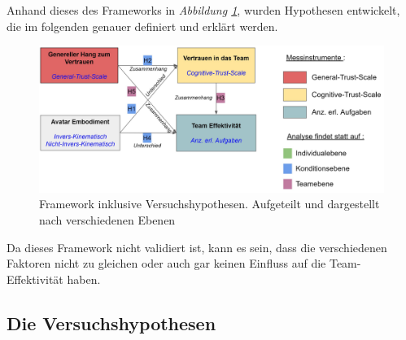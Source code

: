 \documentclass[a4paper,11pt]{article}%
\renewcommand{\\}{\vspace*{0.5\baselineskip} \newline}
\begin{document}
Anhand dieses des Frameworks in \textit{Abbildung \ref{Versuchshypothesen}}, wurden Hypothesen entwickelt, die im folgenden genauer definiert und erklärt werden.

\begin{figure}[H]
		\begin{footnotesize}
			\includegraphics[width=\textwidth]{Abbildungen/Versuchshypothesen_02.JPG}
			
			\caption{Framework inklusive Versuchshypothesen. Aufgeteilt und dargestellt nach verschiedenen Ebenen}
			\label{Versuchshypothesen}
		\end{footnotesize}
	\end{figure}	

\newpage

Da dieses Framework nicht validiert ist, kann es sein, dass die verschiedenen Faktoren nicht zu gleichen oder auch gar keinen Einfluss auf die Team-Effektivität haben.


\subsection{Die Versuchshypothesen}
\label{VersuchshypothesenAuflistung}
\end{document}
